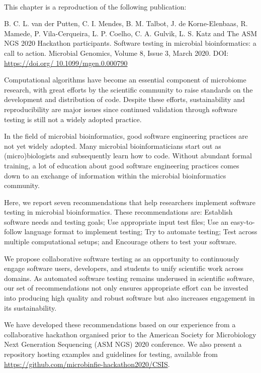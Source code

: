 \mbox{}\\
\vspace{8cm}

This chapter is a reproduction of the following publication:

B. C. L. van der Putten, C. I. Mendes, B. M. Talbot, J. de Korne-Elenbaas, R. Mamede, P. Vila-Cerqueira, L. P. Coelho, C. A. Gulvik, L. S. Katz and The ASM NGS 2020 Hackathon participants. Software testing in microbial bioinformatics: a call to action. Microbial Genomics, Volume 8, Issue 3, March 2020. DOI: \url{https://doi.org/ 10.1099/mgen.0.000790}

Computational algorithms have become an essential component of microbiome research, with great efforts by the scientific community to raise standards on the development and distribution of code. Despite these efforts, sustainability and reproducibility are major issues since continued validation through software testing is still not a widely adopted practice.  

In the field of microbial bioinformatics, good software engineering practices are not yet widely adopted. Many microbial bioinformaticians start out as (micro)biologists and subsequently learn how to code. Without abundant formal training, a lot of education about good software engineering practices comes down to an exchange of information within the microbial bioinformatics community. 

Here, we report seven recommendations that help researchers implement software testing in microbial bioinformatics. These recommendations are: Establish software needs and testing goals; Use appropriate input test files; Use an easy-to-follow language format to implement testing; Try to automate testing; Test across multiple computational setups; and Encourage others to test your software.

We propose collaborative software testing as an opportunity to continuously engage software users, developers, and students to unify scientific work across domains. As automated software testing remains underused in scientific software, our set of recommendations not only ensures appropriate effort can be invested into producing high quality and robust software but also increases engagement in its sustainability.

We have developed these recommendations based on our experience from a collaborative hackathon organised prior to the American Society for Microbiology Next Generation Sequencing (ASM NGS) 2020 conference. We also present a repository hosting examples and guidelines for testing, available from \url{https://github.com/microbinfie-hackathon2020/CSIS}.

